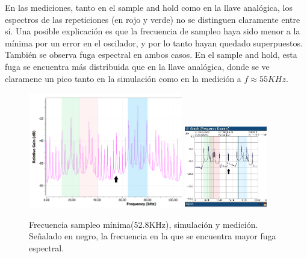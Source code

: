 \documentclass[../../ASSD_TP1_G7.tex]{subfiles}
\begin{document}
En las mediciones, tanto en el sample and hold como en la llave anal\'ogica, los espectros de las repeticiones (en rojo y verde) no se distinguen claramente entre s\'i. Una posible explicaci\'on es que la frecuencia de sampleo haya sido menor a la m\'inima por un error en el oscilador, y por lo tanto hayan quedado superpuestos. Tambi\'en se observa fuga espectral en ambos casos. En el sample and hold, esta fuga se encuentra m\'as distribuida que en la llave anal\'ogica, donde se ve claramene un pico tanto en la simulaci\'on como en la medici\'on a $f\approx 55KHz$.

\begin{figure}[H]
\centering
{}
{\includegraphics[width=0.6\textwidth]{figures/simpto_8_llave_52,8khz_espectro.png}}
{\includegraphics[width=0.32\textwidth]{figures/lla_fmin.jpeg}}
\caption{Frecuencia sampleo mínima(52.8KHz), simulación y medición. Se\~nalado en negro, la frecuencia en la que se encuentra mayor fuga espectral.}
\label{fig:subnyq_lla_fmin}
\end{figure}
\end{document}
